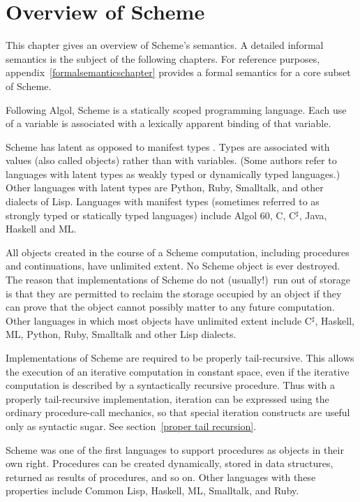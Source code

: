 \chapter{Overview of Scheme}
\label{semanticchapter}

This chapter gives an overview of Scheme's semantics.  A
detailed informal semantics is the subject of
the following chapters.  For reference
purposes, appendix~\ref{formalsemanticschapter} provides a formal
semantics for a core subset of Scheme.

\vest Following Algol, Scheme is a statically scoped programming
language.  Each use of a variable is associated with a lexically
apparent binding of that variable.

\vest Scheme has latent as opposed to manifest types
\cite{WaiteGoos}.  Types
are associated with values (also called objects) rather than
with variables.  (Some authors refer to languages with latent types as
weakly typed or dynamically typed languages.)  Other languages with
latent types are Python, Ruby, Smalltalk, and other dialects of Lisp.  Languages
with manifest types (sometimes referred to as strongly typed or
statically typed languages) include Algol 60, C, C$^\sharp$, Java, Haskell and ML.

\vest All objects created in the course of a Scheme computation, including
procedures and continuations, have unlimited extent.
No Scheme object is ever destroyed.  The reason that
implementations of Scheme do not (usually!)\ run out of storage is that
they are permitted to reclaim the storage occupied by an object if
they can prove that the object cannot possibly matter to any future
computation.  Other languages in which most objects have unlimited
extent include C$^\sharp$, Haskell, ML, Python, Ruby, Smalltalk and other Lisp dialects.

\vest Implementations of Scheme are required to be properly tail-recursive.
This allows the execution of an iterative computation in constant space,
even if the iterative computation is described by a syntactically
recursive procedure.  Thus with a properly tail-recursive implementation,
iteration can be expressed using the ordinary procedure-call
mechanics, so that special iteration constructs are useful only as
syntactic sugar.  See section~\ref{proper tail recursion}.

\vest Scheme was one of the first languages to support procedures as
objects in their own right.  Procedures can be created dynamically,
stored in data structures, returned as results of procedures, and so
on.  Other languages with these properties include Common Lisp,
Haskell, ML, Smalltalk, and Ruby.

